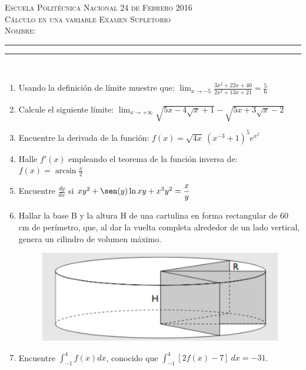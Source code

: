 \documentclass[11pt,a4paper,oneside]{article}\usepackage[]{graphicx}\usepackage[]{color}
\begin{document}
\thispagestyle{empty}
{\sf
{\Large \scshape Escuela Polit\'{e}cnica Nacional} \hfill {\scshape 24 de Febrero 2016}\\[3mm] 
{\scshape C\'{a}lculo en una variable \hfill Examen Supletorio}\\[7mm]
{\scshape Nombre:} \rule{0.6\textwidth}{0.5pt} \rule{0.1\textwidth}{0.5pt}\\
}




\begin{enumerate}
      \item Usando la definición de límite muestre que: $\displaystyle \lim_{x \to -5} \frac{3x^2+22x+40}{2x^2+13x+21}=\frac{5}{6}$
      
      \item Calcule el siguiente límite: $\displaystyle \lim_{x\to +\infty} \sqrt{5x-4\sqrt{x}+1}-\sqrt{5x+3\sqrt{x}-2} $
      
      \item Encuentre la derivada de la función: $\displaystyle f(x)=\sqrt{4x}\ (x^{-3}+1)^5 e^{x^2}$
      
      \item Halle $f'(x)$ empleando el teorema de la función inversa de: $f(x)=\arcsin \displaystyle\frac{x}{2}$
      
      \item Encuentre $\displaystyle \frac{dy}{dx}$ si $xy^2 +\sen(y) \ln xy + x^3y^2=\displaystyle \frac{x}{y}$
      
      \item Hallar la base B y la altura H de una cartulina en forma rectangular de 60 cm de perímetro, que, al dar la vuelta completa alrededor de un lado vertical, genera un cilindro de volumen máximo.
      
      \begin{figure}[H]
      \centering
      \includegraphics[scale=0.45]{derivada.png}
      \end{figure}
      
      \item Encuentre $\displaystyle \int_{-1}^{4} f(x) dx$, conocido que $\displaystyle \int_{-1}^{4} \left[2f(x)-7\right]\ dx=-31$.
      

\end{enumerate}
\end{document}
